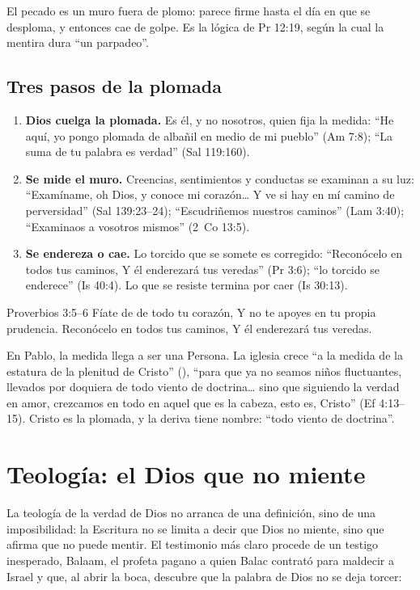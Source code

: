 El pecado es un muro fuera de plomo: parece firme hasta el día en que se desploma, y entonces cae de golpe. Es la lógica de Pr 12:19, según la cual la mentira dura ``un parpadeo''.

\subsection{Tres pasos de la plomada}
\begin{enumerate}
\item \textbf{Dios cuelga la plomada.} Es él, y no nosotros, quien fija la medida: ``He aquí, yo pongo plomada de albañil en medio de mi pueblo'' (Am 7:8); ``La suma de tu palabra es verdad'' (Sal 119:160).
\item \textbf{Se mide el muro.} Creencias, sentimientos y conductas se examinan a su luz: ``Examíname, oh Dios, y conoce mi corazón\ldots{} Y ve si hay en mí camino de perversidad'' (Sal 139:23--24); ``Escudriñemos nuestros caminos'' (Lam 3:40); ``Examinaos a vosotros mismos'' (2~Co 13:5).
\item \textbf{Se endereza o cae.} Lo torcido que se somete es corregido: ``Reconócelo en todos tus caminos, Y él enderezará tus veredas'' (Pr 3:6); ``lo torcido se enderece'' (Is 40:4). Lo que se resiste termina por caer (Is 30:13).
\end{enumerate}

\begin{verso}{Proverbios 3:5–6}
Fíate de \SENOR{} de todo tu corazón, Y no te apoyes en tu propia prudencia. Reconócelo en todos tus caminos, Y él enderezará tus veredas.
\end{verso}

En Pablo, la medida llega a ser una Persona. La iglesia crece ``a la medida de la estatura de la plenitud de Cristo'' (), ``para que ya no seamos niños fluctuantes, llevados por doquiera de todo viento de doctrina\ldots{} sino que siguiendo la verdad en amor, crezcamos en todo en aquel que es la cabeza, esto es, Cristo'' (Ef 4:13--15). Cristo es la plomada, y la deriva tiene nombre: ``todo viento de doctrina''.

\section{Teología: el Dios que no miente}

La teología de la verdad de Dios no arranca de una definición, sino de una imposibilidad: la Escritura no se limita a decir que Dios no miente, sino que afirma que no puede mentir. El testimonio más claro procede de un testigo inesperado, Balaam, el profeta pagano a quien Balac contrató para maldecir a Israel y que, al abrir la boca, descubre que la palabra de Dios no se deja torcer:

